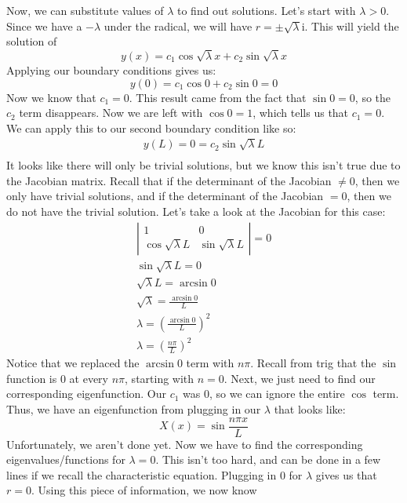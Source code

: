 \documentclass{article}
\begin{document}
\indent Now, we can substitute values of $\lambda$ to find out solutions. Let's
start with $\lambda > 0$. Since we have a $-\lambda$ under the radical, we will
have $r = \pm \sqrt{\lambda} \mathrm{i}$. This will yield the solution of
\[
y(x) = c_{1}\cos{\sqrt{\lambda}x} + c_{2}\sin{\sqrt{\lambda}x}
\]
\noindent Applying our boundary conditions gives us:
\[
y(0) = c_{1}\cos{0} + c_{2}\sin{0} = 0
\]
\noindent Now we know that $c_{1} = 0$. This result came from the fact that
$\sin{0} = 0$, so the $c_{2}$ term disappears. Now we are left with $\cos{0} = 1$,
which tells us that $c_{1} = 0$. We can apply this to our second boundary
condition like so:
\begin{gather*}
y(L) = 0 = c_{2}\sin{\sqrt{\lambda}L}\\
\end{gather*}
\noindent It looks like there will only be trivial solutions, but we know this
isn't true due to the Jacobian matrix. Recall that if the determinant of the
Jacobian $\neq 0$, then we only have trivial solutions, and if the determinant
of the Jacobian $= 0$, then we do not have the trivial solution. Let's take a
look at the Jacobian for this case:
\begin{gather*}
\left|
\begin{array}{cc}
1 & 0\\
\cos{\sqrt{\lambda}L} & \sin{\sqrt{\lambda}L}
\end{array}
\right| = 0\\
\sin{\sqrt{\lambda}L} = 0\\
\sqrt{\lambda}L = \arcsin{0}\\
\sqrt{\lambda} = \frac{\arcsin{0}}{L}\\
\lambda = \left(\frac{\arcsin{0}}{L}\right)^{2}\\
\lambda = \left(\frac{n\pi}{L}\right)^{2}
\end{gather*}
\noindent Notice that we replaced the $\arcsin{0}$ term with $n\pi$. Recall from
trig that the $\sin$ function is $0$ at every $n\pi$, starting with $n = 0$.
Next, we just need to find our corresponding eigenfunction. Our $c_{1}$ was $0$,
so we can ignore the entire $\cos$ term. Thus, we have an eigenfunction from
plugging in our $\lambda$ that looks like:
\[
X(x) = \sin{\frac{n\pi x}{L}}
\]
\indent Unfortunately, we aren't done yet. Now we have to find the corresponding
eigenvalues/functions for $\lambda = 0$. This isn't too hard, and can be done in
a few lines if we recall the characteristic equation. Plugging in $0$ for
$\lambda$ gives us that $r = 0$. Using this piece of information, we now know
\end{document}
